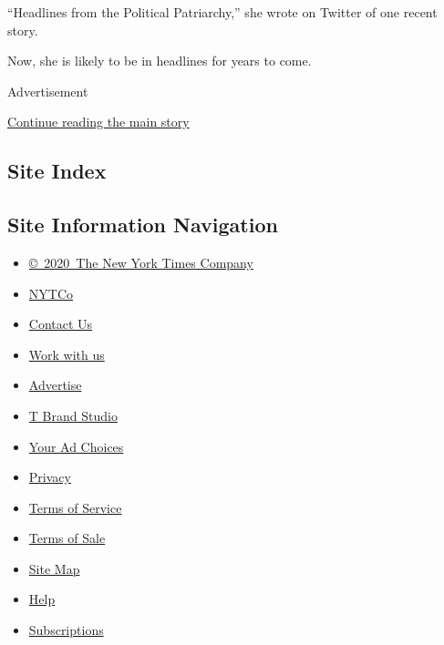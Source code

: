 ``Headlines from the Political Patriarchy,'' she wrote on Twitter of one
recent story.

Now, she is likely to be in headlines for years to come.

Advertisement

\protect\hyperlink{after-bottom}{Continue reading the main story}

\hypertarget{site-index}{%
\subsection{Site Index}\label{site-index}}

\hypertarget{site-information-navigation}{%
\subsection{Site Information
Navigation}\label{site-information-navigation}}

\begin{itemize}
\tightlist
\item
  \href{https://help.nytimes3xbfgragh.onion/hc/en-us/articles/115014792127-Copyright-notice}{©~2020~The
  New York Times Company}
\end{itemize}

\begin{itemize}
\tightlist
\item
  \href{https://www.nytco.com/}{NYTCo}
\item
  \href{https://help.nytimes3xbfgragh.onion/hc/en-us/articles/115015385887-Contact-Us}{Contact
  Us}
\item
  \href{https://www.nytco.com/careers/}{Work with us}
\item
  \href{https://nytmediakit.com/}{Advertise}
\item
  \href{http://www.tbrandstudio.com/}{T Brand Studio}
\item
  \href{https://www.nytimes3xbfgragh.onion/privacy/cookie-policy\#how-do-i-manage-trackers}{Your
  Ad Choices}
\item
  \href{https://www.nytimes3xbfgragh.onion/privacy}{Privacy}
\item
  \href{https://help.nytimes3xbfgragh.onion/hc/en-us/articles/115014893428-Terms-of-service}{Terms
  of Service}
\item
  \href{https://help.nytimes3xbfgragh.onion/hc/en-us/articles/115014893968-Terms-of-sale}{Terms
  of Sale}
\item
  \href{https://spiderbites.nytimes3xbfgragh.onion}{Site Map}
\item
  \href{https://help.nytimes3xbfgragh.onion/hc/en-us}{Help}
\item
  \href{https://www.nytimes3xbfgragh.onion/subscription?campaignId=37WXW}{Subscriptions}
\end{itemize}
